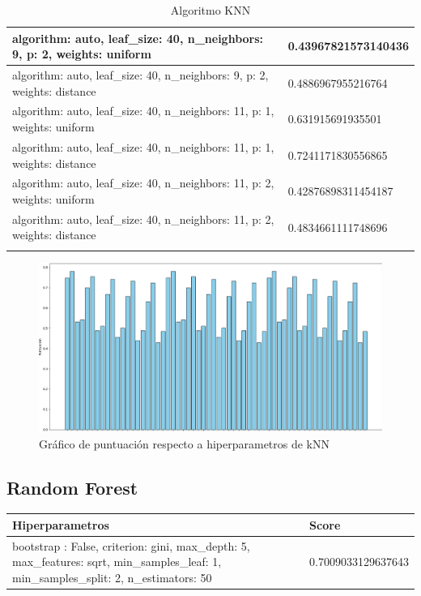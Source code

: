 \documentclass{report}
\begin{document}
{\begin{longtable}{|p{295.6px}|p{100.3px}|}
                    algorithm: auto, leaf\_size: 40, n\_neighbors: 9, p: 2, weights: uniform & 0.43967821573140436 \\
                    \hline
                    algorithm: auto, leaf\_size: 40, n\_neighbors: 9, p: 2, weights: distance & 0.4886967955216764 \\
                    \hline
                    algorithm: auto, leaf\_size: 40, n\_neighbors: 11, p: 1, weights: uniform & 0.631915691935501 \\
                    \hline
                    algorithm: auto, leaf\_size: 40, n\_neighbors: 11, p: 1, weights: distance & 0.7241171830556865 \\
                    \hline
                    algorithm: auto, leaf\_size: 40, n\_neighbors: 11, p: 2, weights: uniform & 0.42876898311454187 \\
                    \hline
                    algorithm: auto, leaf\_size: 40, n\_neighbors: 11, p: 2, weights: distance & 0.4834661111748696 \\
                    \hline
                    \caption{Algoritmo KNN}
                \end{longtable}
                \begin{figure}[H]
                    \centering
                    \includegraphics[width=1\linewidth]{img/ibai2.png}
                    \caption{Gráfico de puntuación respecto a hiperparametros de kNN}
                \end{figure}
            \clearpage
            \subsection{Random Forest}
                \label{tab:resultados_analisis_sentimientos} 
                    \begin{longtable}{|p{285.6px}|p{100.3px}|}
                    \hline
                    \textbf{Hiperparametros} & \textbf{Score}\\
                    \hline                    
                    bootstrap : False, criterion: gini, max\_depth: 5, max\_features: sqrt,  min\_samples\_leaf: 1, min\_samples\_split: 2, n\_estimators: 50 & 0.7009033129637643 \\
                    

\end{longtable}}
\end{document}
